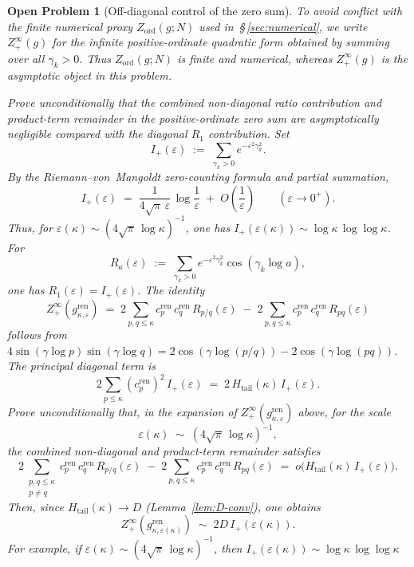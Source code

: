 \documentclass[11pt]{article}
\newtheorem{openproblem}[theorem]{Open Problem}
\newcommand{\cren}{c_p^{\mathrm{ren}}}
\begin{document}
\begin{openproblem}[Off-diagonal control of the zero sum]\label{op:offdiag}
To avoid conflict with the finite numerical proxy
$Z_{\mathrm{ord}}(g;N)$ used in~\S\,\ref{sec:numerical},
we write $Z_+^{\infty}(g)$ for the infinite positive-ordinate
quadratic form obtained by summing over all $\gamma_k>0$.
Thus $Z_{\mathrm{ord}}(g;N)$ is finite and numerical,
whereas $Z_+^{\infty}(g)$ is the asymptotic object in this
problem.

Prove unconditionally that the combined non-diagonal
ratio contribution and product-term remainder in the
positive-ordinate zero sum are asymptotically negligible
compared with the diagonal $R_1$ contribution.
Set
\[
I_+(\varepsilon)
\;:=\; \sum_{\gamma_k>0} e^{-\varepsilon^2\gamma_k^2}.
\]
By the Riemann--von~Mangoldt zero-counting formula and partial
summation,
\[
I_+(\varepsilon)
\;=\;
\frac{1}{4\sqrt\pi\,\varepsilon}\,\log\frac{1}{\varepsilon}
\;+\; O\!\left(\frac{1}{\varepsilon}\right)
\qquad (\varepsilon\to 0^+).
\]
Thus, for
$\varepsilon(\kappa)\sim (4\sqrt\pi\,\log\kappa)^{-1}$,
one has
$I_+(\varepsilon(\kappa))\sim\log\kappa\,\log\log\kappa$.
For
\[
R_a(\varepsilon)
\;:=\; \sum_{\gamma_k>0}
e^{-\varepsilon^2\gamma_k^2}\cos(\gamma_k\log a),
\]
one has $R_1(\varepsilon)=I_+(\varepsilon)$.
The identity
\[
Z_+^{\infty}(g^{\mathrm{ren}}_{\kappa,\varepsilon})
\;=\; 2\!\sum_{p,q\le\kappa}
\cren\,c_q^{\mathrm{ren}}\,R_{p/q}(\varepsilon)
\;-\; 2\!\sum_{p,q\le\kappa}
\cren\,c_q^{\mathrm{ren}}\,R_{pq}(\varepsilon)
\]
follows from
$4\sin(\gamma\log p)\sin(\gamma\log q)
= 2\cos(\gamma\log(p/q)) - 2\cos(\gamma\log(pq))$.
The principal diagonal term is
\[
2\sum_{p\le\kappa}(\cren)^2\,I_+(\varepsilon)
\;=\; 2\,H_{\mathrm{tail}}(\kappa)\,I_+(\varepsilon).
\]
Prove unconditionally that, in the expansion of
$Z_+^{\infty}(g^{\mathrm{ren}}_{\kappa,\varepsilon})$
above, for the scale
\[
\varepsilon(\kappa)
\;\sim\; (4\sqrt\pi\,\log\kappa)^{-1},
\]
the combined non-diagonal and product-term remainder
satisfies
\[
2\!\!\!\sum_{\substack{p,q\le\kappa \\ p\ne q}}\!\!\!
\cren\,c_q^{\mathrm{ren}}\,R_{p/q}(\varepsilon)
\;-\; 2\!\sum_{p,q\le\kappa}
\cren\,c_q^{\mathrm{ren}}\,R_{pq}(\varepsilon)
\;=\; o\bigl(H_{\mathrm{tail}}(\kappa)\,I_+(\varepsilon)\bigr).
\]
Then, since $H_{\mathrm{tail}}(\kappa)\to D$
(Lemma~\ref{lem:D-conv}), one obtains
\[
Z_+^{\infty}(g^{\mathrm{ren}}_{\kappa,\varepsilon(\kappa)})
\;\sim\; 2D\,I_+(\varepsilon(\kappa)).
\]
For example, if
$\varepsilon(\kappa)\sim (4\sqrt\pi\,\log\kappa)^{-1}$,
then $I_+(\varepsilon(\kappa))\sim\log\kappa\,\log\log\kappa$

\end{openproblem}
\end{document}
